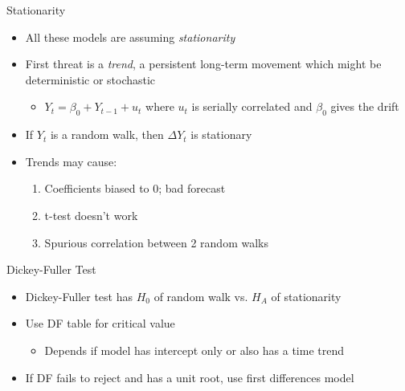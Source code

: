 \documentclass[aspectratio=169]{beamer}
\begin{document}
\begin{frame}{Stationarity}
    \begin{itemize}
        \item All these models are assuming \textit{stationarity}
        \item First threat is a \textit{trend}, a persistent long-term movement which might be deterministic or stochastic
        \begin{itemize}
            \item $Y_t = \beta_0 + Y_{t-1} + u_t$ where $u_t$ is serially correlated and $\beta_0$ gives the drift
        \end{itemize}
        \item If $Y_t$ is a random walk, then $\Delta Y_t$ is stationary
        \item Trends may cause:
        \begin{enumerate}
            \item Coefficients biased to 0; bad forecast
            \item t-test doesn't work
            \item Spurious correlation between 2 random walks
        \end{enumerate}
    \end{itemize}
\end{frame}

\begin{frame}{Dickey-Fuller Test}
    \begin{itemize}
        \item Dickey-Fuller test has $H_0$ of random walk vs. $H_A$ of stationarity
        \item Use DF table for critical value
        \begin{itemize}
            \item Depends if model has intercept only or also has a time trend
        \end{itemize}
        \item If DF fails to reject and has a unit root, use first differences model 
    \end{itemize}
\end{frame}
\end{document}
